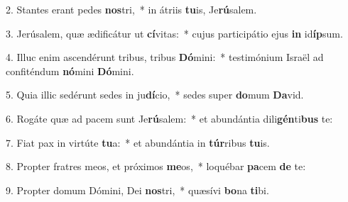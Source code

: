 2. Stantes erant pedes \textbf{nos}tri,~*  in átriis \textbf{tu}is, Je\textbf{rú}salem.\

3. Jerúsalem, quæ ædificátur ut \textbf{cí}vitas:~*  cujus participátio ejus \textbf{in} id\textbf{íp}sum.\

4. Illuc enim ascendérunt tribus, tribus \textbf{Dó}mini:~*  testimónium Israël ad confiténdum \textbf{nó}mini \textbf{Dó}mini.\

5. Quia illic sedérunt sedes in ju\textbf{dí}cio,~*  sedes super \textbf{do}mum \textbf{Da}vid.\

6. Rogáte quæ ad pacem sunt Je\textbf{rú}salem:~*  et abundántia dili\textbf{gén}ti\textbf{bus} te:\

7. Fiat pax in virtúte \textbf{tu}a:~*  et abundántia in \textbf{túr}ribus \textbf{tu}is.\

8. Propter fratres meos, et próximos \textbf{me}os,~*  loquébar \textbf{pa}cem \textbf{de} te:\

9. Propter domum Dómini, Dei \textbf{nos}tri,~*  quæsívi \textbf{bo}na \textbf{ti}bi.\

